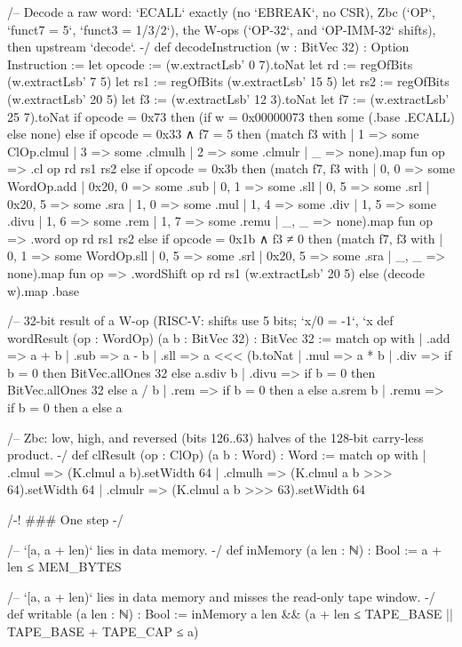 \begin{leancode}[fontsize=\scriptsize,label={\footnotesize Contract/Machine.lean}]
/-- Decode a raw word: `ECALL` exactly (no `EBREAK`, no CSR), Zbc (`OP`, `funct7 = 5`,
`funct3 = 1/3/2`), the W-ops (`OP-32`, and `OP-IMM-32` shifts), then upstream `decode`. -/
def decodeInstruction (w : BitVec 32) : Option Instruction :=
  let opcode := (w.extractLsb' 0 7).toNat
  let rd := regOfBits (w.extractLsb' 7 5)
  let rs1 := regOfBits (w.extractLsb' 15 5)
  let rs2 := regOfBits (w.extractLsb' 20 5)
  let f3 := (w.extractLsb' 12 3).toNat
  let f7 := (w.extractLsb' 25 7).toNat
  if opcode = 0x73 then (if w = 0x00000073 then some (.base .ECALL) else none)
  else if opcode = 0x33 ∧ f7 = 5 then
    (match f3 with | 1 => some ClOp.clmul | 3 => some .clmulh | 2 => some .clmulr | _ => none).map
      fun op => .cl op rd rs1 rs2
  else if opcode = 0x3b then
    (match f7, f3 with
      | 0, 0 => some WordOp.add | 0x20, 0 => some .sub | 0, 1 => some .sll | 0, 5 => some .srl
      | 0x20, 5 => some .sra | 1, 0 => some .mul | 1, 4 => some .div | 1, 5 => some .divu
      | 1, 6 => some .rem | 1, 7 => some .remu | _, _ => none).map fun op => .word op rd rs1 rs2
  else if opcode = 0x1b ∧ f3 ≠ 0 then
    (match f7, f3 with
      | 0, 1 => some WordOp.sll | 0, 5 => some .srl | 0x20, 5 => some .sra | _, _ => none).map
      fun op => .wordShift op rd rs1 (w.extractLsb' 20 5)
  else (decode w).map .base

/-- 32-bit result of a W-op (RISC-V: shifts use 5 bits; `x/0 = -1`, `x %
def wordResult (op : WordOp) (a b : BitVec 32) : BitVec 32 :=
  match op with
  | .add => a + b | .sub => a - b
  | .sll => a <<< (b.toNat %
  | .mul => a * b
  | .div => if b = 0 then BitVec.allOnes 32 else a.sdiv b
  | .divu => if b = 0 then BitVec.allOnes 32 else a / b
  | .rem => if b = 0 then a else a.srem b
  | .remu => if b = 0 then a else a %

/-- Zbc: low, high, and reversed (bits 126..63) halves of the 128-bit carry-less product. -/
def clResult (op : ClOp) (a b : Word) : Word :=
  match op with
  | .clmul => (K.clmul a b).setWidth 64
  | .clmulh => (K.clmul a b >>> 64).setWidth 64
  | .clmulr => (K.clmul a b >>> 63).setWidth 64

/-! ### One step -/

/-- `[a, a + len)` lies in data memory. -/
def inMemory (a len : ℕ) : Bool := a + len ≤ MEM_BYTES

/-- `[a, a + len)` lies in data memory and misses the read-only tape window. -/
def writable (a len : ℕ) : Bool :=
  inMemory a len && (a + len ≤ TAPE_BASE || TAPE_BASE + TAPE_CAP ≤ a)


\end{leancode}

